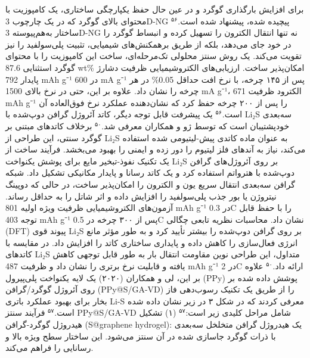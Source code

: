 \documentclass[12pt,a4paper,twocolumn]{article} %
\newcommand{\persian}[1]{\textfarsi{#1}}
\newcommand{\english}[1]{\textenglish{#1}}
\begin{document}
\persian{
برای افزایش بارگذاری گوگرد و در عین حال حفظ یکپارچگی ساختاری، یک کامپوزیت با محتوای بالای گوگرد که در یک چارچوب \english{3D-NG} پیچیده شده، پیشنهاد شده است.$^{۵۶}$ ساختار به‌هم‌پیوسته \english{3D-NG} نه تنها انتقال الکترون را تسهیل کرده و انبساط گوگرد را در خود جای می‌دهد، بلکه از طریق برهمکنش‌های شیمیایی، تثبیت پلی‌سولفید را نیز تقویت می‌کند. یک روش سنتز محلولی تک‌مرحله‌ای، ساخت این کامپوزیت را با محتوای گوگرد استثنایی \english{87.6 wt\%} امکان‌پذیر ساخت. ارزیابی‌های الکتروشیمیایی ظرفیت دشارژ پایدار \english{792 mAh g⁻¹} در \english{600 mA g⁻¹} پس از ۱۴۵ چرخه، با نرخ افت حداقل \english{0.05\%} در هر چرخه را نشان داد. علاوه بر این، حتی در نرخ بالای \english{1500 mA g⁻¹}، الکترود ظرفیت \english{671 mAh g⁻¹} را پس از ۲۰۰ چرخه حفظ کرد که نشان‌دهنده عملکرد نرخ فوق‌العاده آن است.$^{۵۶}$
}
\persian{
یک پیشرفت قابل توجه دیگر، کاتد آئروژل گرافن دوپ‌شده با \english{Li₂S} سه‌بعدی خودپشتیبان است که توسط ژو و همکاران معرفی شد.$^{۵۰}$ برخلاف کاتدهای مبتنی بر گوگرد سنتی، این طراحی از \english{Li₂S} به عنوان ماده کاتدی پیش-لیتیومی شده استفاده می‌کند، نیاز به آندهای فلز لیتیوم را دور زده و ایمنی را بهبود می‌بخشد. فرآیند ساخت از یک تکنیک نفوذ-تبخیر مایع برای پوشش یکنواخت \english{Li₂S} بر روی آئروژل‌های گرافن دوپ‌شده با هترواتم استفاده کرد و یک کاتد رسانا و پایدار مکانیکی تشکیل داد. شبکه گرافن سه‌بعدی انتقال سریع یون و الکترون را امکان‌پذیر ساخت، در حالی که دوپینگ نیتروژن یا بور جذب پلی‌سولفید را افزایش داده و اثر شاتل را به حداقل رساند. آزمون‌های الکتروشیمیایی ظرفیت ویژه اولیه \english{801 mAh g⁻¹} در \english{0.3C} را با حفظ قابل توجه \english{403 mAh g⁻¹} پس از ۳۰۰ چرخه در \english{0.5C} نشان داد. محاسبات نظریه تابعی چگالی (\english{DFT}) پیوند قوی \english{Li₂S} بر روی گرافن دوپ‌شده را بیشتر تأیید کرد و به طور مؤثر مانع انرژی فعال‌سازی را کاهش داده و پایداری ساختاری کاتد را افزایش داد. در مقایسه با کاتدهای \english{Li₂S} متداول، این طراحی نوین مقاومت انتقال بار به طور قابل توجهی کاهش یافته و قابلیت نرخ برتری را نشان داد و ظرفیت \english{487 mAh g⁻¹} در \english{2C} ارائه داد.$^{۵۰}$
}
\persian{
علاوه بر این، لی و همکاران (۲۰۲۰) یک لایه یکنواخت پلی‌پیرول (\english{PPy}) پوشش داده شده بر روی آئروژل گوگرد/گرافن (\english{PPy@S/GA-VD}) را از طریق یک تکنیک رسوب‌دهی فاز بخار برای بهبود عملکرد باتری \english{Li-S} معرفی کردند که در شکل ۳ در زیر نشان داده شده است.$^{۵۷}$
}
\persian{
فرآیند سنتز \english{PPy@S/GA-VD} شامل مراحل کلیدی زیر است:$^{۵۷}$ (۱) تشکیل هیدروژل گوگرد-گرافن (\english{S@graphene hydrogel}): یک هیدروژل گرافن متخلخل سه‌بعدی با ذرات گوگرد جاسازی شده در آن سنتز می‌شود. این ساختار سطح ویژه بالا و رسانایی را فراهم می‌کند.
}
\end{document}
